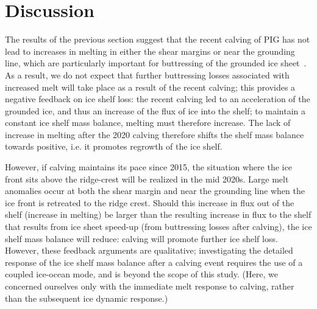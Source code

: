 \documentclass[draft]{agujournal2019}
\begin{document}


\section{Discussion}\label{S:Discussion}
The results of the previous section suggest that the recent calving of PIG has not lead to increases in melting in either the shear margins or near the grounding line, which are particularly important for buttressing of the grounded ice sheet~\cite{Furst2016NatureClimCh, Reese2018NatureClimCh}. As a result, we do not expect that further buttressing losses associated with increased melt will take place as a result of the recent calving; this provides a negative feedback on ice shelf loss: the recent calving led to an acceleration of the grounded ice, and thus an increase of the flux of ice into the shelf; to maintain a constant ice shelf mass balance, melting must therefore increase. The lack of increase in melting after the 2020 calving therefore shifts the shelf mass balance towards positive, i.e. it promotes regrowth of the ice shelf.

However, if calving maintains its pace since 2015, the situation where the ice front sits above the ridge-crest will be realized in the mid 2020s. Large melt anomalies occur at both the shear margin and near the grounding line when the ice front is retreated to the ridge crest. Should this increase in flux out of the shelf (increase in melting) be larger than the resulting increase in flux to the shelf that results from ice sheet speed-up (from buttressing losses after calving), the ice shelf mass balance will reduce: calving will promote further ice shelf loss. However, these feedback arguments are qualitative; investigating the detailed response of the ice shelf mass balance after a calving event requires the use of a coupled ice-ocean mode, and is beyond the scope of this study. (Here, we concerned ourselves only with the immediate melt response to calving, rather than the subsequent ice dynamic response.)
\end{document}

